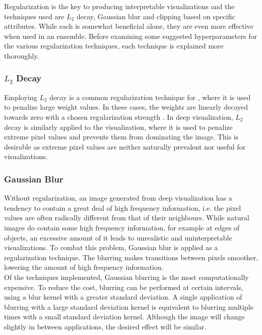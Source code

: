 \noindent Regularization is the key to producing interpretable visualizations and the techniques used are $L_2$ decay, Gaussian blur and clipping based on specific attributes. While each is somewhat beneficial alone, they are even more effective when used in an ensemble. Before examining some suggested hyperparameters for the various regularization techniques, each technique is explained more thoroughly.

\subsubsection{$L_2$ Decay}

Employing $L_2$ decay is a common regularization technique for , where it is used to penalize large weight values. In these cases, the weights are linearly decayed towards zero with a chosen regularization strength \cite{cs231n-reg}. In deep visualization, $L_2$ decay is similarly applied to the visualization, where it is used to penalize extreme pixel values and prevents them from dominating the image. This is desirable as extreme pixel values are neither naturally prevalent nor useful for visualizations.

\subsubsection{Gaussian Blur}

Without regularization, an image generated from deep visualization has a tendency to contain a great deal of high frequency information, i.e. the pixel values are often radically different from that of their neighbours. While natural images do contain some high frequency information, for example at edges of objects, an excessive amount of it leads to unrealistic and uninterpretable visualizations. To combat this problem, Gaussian blur is applied as a regularization technique. The blurring makes transitions between pixels smoother, lowering the amount of high frequency information. \\

\noindent Of the techniques implemented, Gaussian blurring is the most computationally expensive. To reduce the cost, blurring can be performed at certain intervals, using a blur kernel with a greater standard deviation. A single application of blurring with a large standard deviation kernel is equivalent to blurring multiple times with a small standard deviation kernel. Although the image will change slightly in between applications, the desired effect will be similar. 

